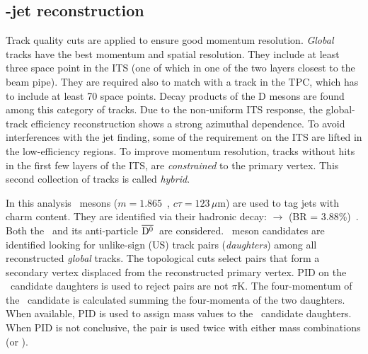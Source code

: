 \documentclass[a4paper]{jpconf}
\begin{document}
\subsection{\Dzero-jet reconstruction}
Track quality cuts are applied to ensure good momentum resolution. 
\emph{Global} tracks have the best momentum and spatial resolution. They include at least three space point in the ITS (one of which in one of the two layers closest to the beam pipe).
They are required also to match with a track in the TPC, which has to include at least 70 space points.
Decay products of the D mesons are found among this category of tracks.
Due to the non-uniform ITS response, the global-track efficiency reconstruction shows a strong azimuthal dependence.
To avoid interferences with the jet finding, some of the requirement on the ITS are lifted in the low-efficiency regions.
To improve momentum resolution, tracks without hits in the first few layers of the ITS, are \emph{constrained} to the primary vertex. 
This second collection of tracks is called \emph{hybrid}.

In this analysis \Dzero\ mesons ($m=1.865$~\GeVcsq, $c\tau=123\,\mu$m) are used to tag jets with charm content.
They are identified via their hadronic decay: \Dzero $\rightarrow$ \pip \kam (BR = 3.88\%)~\cite{PDG:2014}. Both the \Dzero\ and its
anti-particle $\overline{\mathrm{D^{0}}}$~are considered.
\Dzero\ meson candidates are identified looking for unlike-sign (US) track pairs (\emph{daughters}) among all reconstructed \emph{global} tracks.
The topological cuts select pairs that form a secondary vertex displaced from the reconstructed
primary vertex. PID on the \Dzero\ candidate daughters is used to reject pairs are not $\pi$K.
The four-momentum of the \Dzero\ candidate is calculated summing the four-momenta of the two daughters.
When available, PID is used to assign mass values to the \Dzero\ candidate daughters. When PID is not conclusive,
the pair is used twice with either mass combinations (\pip \kam or \pim \kap). 
\end{document}
